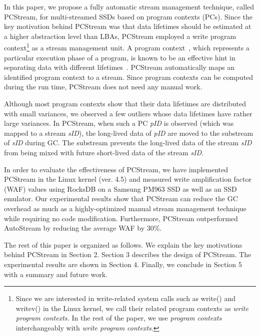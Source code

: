 In this paper, we propose a fully automatic stream management technique, called {\sf PCStream}, 
for multi-streamed SSDs based on program contexts (PCs).
Since the key motivation behind {\sf PCStream} was 
that data lifetimes should be estimated at a higher abstraction level than LBAs, 
{\sf PCStream} employed a write program context\footnote{Since we are interested in write-related 
system calls such as write() and writev() in the Linux kernel, 
we call their related program contexts as 
{\it write program contexts.} In the rest of the paper, we use 
{\it program contexts} interchangeably with {\it write program contexts}.}  
as a stream management unit.
A program context~\cite{PC, PC2}, which represents a particular execution phase of a program, 
is known to be an effective hint in separating data with different lifetimes~\cite{PCHa}.  
{\sf PCStream} automatically maps an identified program context to a stream.  
Since program contexts can be computed during the run time, 
{\sf PCStream} does not need any manual work.   

Although most program contexts show that their data lifetimes are 
distributed with small variances, we observed a few outliers 
whose data lifetimes have rather large variances.
In {\sf PCStream}, 
when such a PC {\it pID} is observed (which was mapped to a stream {\it sID}), 
the long-lived data of {\it pID} are moved to the substream of {\it sID}
during GC.  
The substream prevents the long-lived data of the stream {\it sID} 
from being mixed with future short-lived data of the stream {\it sID}.

In order to evaluate the effectiveness of {\sf PCStream}, 
we have implemented {\sf PCStream}
in the Linux kernel (ver. 4.5) and measured write amplification factor (WAF) values 
using RocksDB on a Samsung PM963 SSD 
as well as an SSD emulator.
Our experimental results show that {\sf PCStream}
can reduce the GC overhead as much as a highly-optimized 
manual stream management technique while requiring no code modification.  
Furthermore, PCStream outperformed AutoStream by reducing the average WAF by 30\%.

The rest of this paper is organized as follows. 
We explain the key motivations behind {\sf PCStream} in Section 2. 
Section 3 describes 
the design of {\sf PCStream}.
The experimental results are shown in Section 4. 
Finally, we conclude in Section 5 with a summary and future work. 

